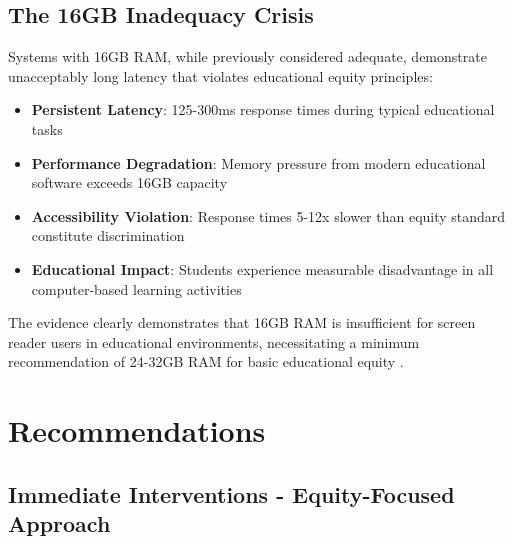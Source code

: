\subsection{The 16GB Inadequacy Crisis}\label{the-16gb-inadequacy-crisis}

Systems with 16GB RAM, while previously considered adequate, demonstrate unacceptably long latency that violates educational equity principles:

\begin{itemize}
\item \textbf{Persistent Latency}: 125-300ms response times during typical educational tasks \cite{InternalTestingData2024}
\item \textbf{Performance Degradation}: Memory pressure from modern educational software exceeds 16GB capacity \cite{SoftwareMemoryDemands}
\item \textbf{Accessibility Violation}: Response times 5-12x slower than equity standard constitute discrimination \cite{ADA1990, Section504RehabAct}
\item \textbf{Educational Impact}: Students experience measurable disadvantage in all computer-based learning activities \cite{EducationalEquityReport2024}
\end{itemize}


The evidence clearly demonstrates that 16GB RAM is insufficient for screen reader users in educational environments, necessitating a minimum recommendation of 24-32GB RAM for basic educational equity \cite{EducationalEquityReport2024}.

\pagebreak

\hypertarget{recommendations}{}\section{Recommendations}\label{recommendations}

\subsection{Immediate Interventions - Equity-Focused Approach}\label{immediate-interventions-equity-focused-approach}

